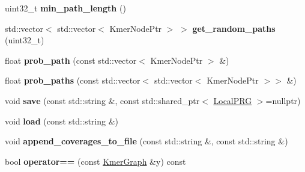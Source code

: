 \begin{DoxyCompactItemize}
uint32\+\_\+t {\bfseries min\+\_\+path\+\_\+length} ()
\item 
\mbox{\label{classKmerGraph_ab20fd8007c42be2b8eb92d7f8446b6dc}} 
std\+::vector$<$ std\+::vector$<$ Kmer\+Node\+Ptr $>$ $>$ {\bfseries get\+\_\+random\+\_\+paths} (uint32\+\_\+t)
\item 
\mbox{\label{classKmerGraph_a319355ec332b55ec6e5ffe718a0ebefc}} 
float {\bfseries prob\+\_\+path} (const std\+::vector$<$ Kmer\+Node\+Ptr $>$ \&)
\item 
\mbox{\label{classKmerGraph_a08e9aaeca1fb902717e2bd3e48b2028a}} 
float {\bfseries prob\+\_\+paths} (const std\+::vector$<$ std\+::vector$<$ Kmer\+Node\+Ptr $>$$>$ \&)
\item 
\mbox{\label{classKmerGraph_a0c36969c87eb866b12db0e655a7a9a1e}} 
void {\bfseries save} (const std\+::string \&, const std\+::shared\+\_\+ptr$<$ \hyperlink{classLocalPRG}{Local\+P\+RG} $>$=nullptr)
\item 
\mbox{\label{classKmerGraph_aa9ebfab7df0503b67dce10e8e5930147}} 
void {\bfseries load} (const std\+::string \&)
\item 
\mbox{\label{classKmerGraph_acd3b14e61faac74b509f8cd4cac0d868}} 
void {\bfseries append\+\_\+coverages\+\_\+to\+\_\+file} (const std\+::string \&, const std\+::string \&)
\item 
\mbox{\label{classKmerGraph_a9e754ef52cb324b4b57f282c8a969c6f}} 
bool {\bfseries operator==} (const \hyperlink{classKmerGraph}{Kmer\+Graph} \&y) const
\end{DoxyCompactItemize}
